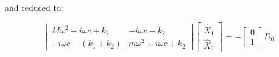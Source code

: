 \documentclass[a4paper]{article}
\begin{document}
and reduced to:

$$
\begin{bmatrix} 
    M\omega ^2 + i\omega c + k_2 & -i\omega c -k_2  \\
    - i\omega c -(k_1 + k_2)  & m\omega ^2 + i\omega c + k_2 
\end{bmatrix} \begin{bmatrix} \hat{X}_1 \\ \hat{X}_2 \end{bmatrix}
= -\begin{bmatrix} 0 \\ 1 \end{bmatrix} D_0
$$
\end{document}

